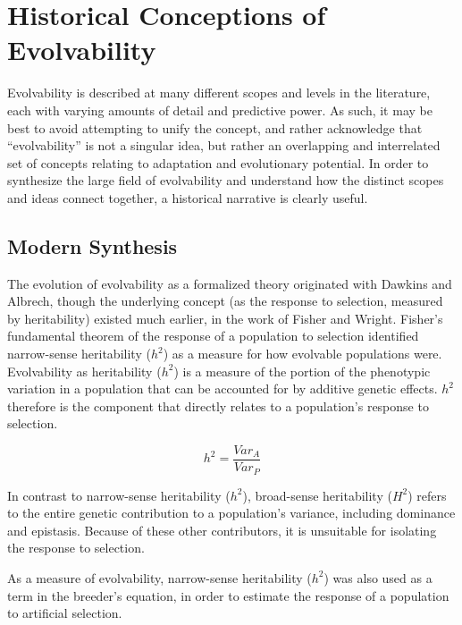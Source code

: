 \documentclass[PhD]{msu-thesis}
\begin{document}
\section{Historical Conceptions of Evolvability}
Evolvability is described at many different scopes and levels in the literature, each with varying amounts of detail and predictive power. As such, it may be best to avoid attempting to unify the concept, and rather acknowledge that “evolvability” is not a singular idea, but rather an overlapping and interrelated set of concepts relating to adaptation and evolutionary potential. In order to synthesize the large field of evolvability and understand how the distinct scopes and ideas connect together, a historical narrative is clearly useful.

\subsection{Modern Synthesis}
The evolution of evolvability as a formalized theory originated with Dawkins\cite{dawkins_13_2003} and \\Albrech\cite{alberch_genes_1991}, though the underlying concept (as the response to selection, measured by heritability) existed much earlier, in the work of Fisher\cite{fisher_genetical_1930} and Wright\cite{wright_evolution_1931}. Fisher’s fundamental theorem of the response of a population to selection identified narrow-sense heritability ($h^2$) as a measure for how evolvable populations were. Evolvability as heritability ($h^2$) is a measure of the portion of the phenotypic variation in a population that can be accounted for by additive genetic effects. $h^2$ therefore is the component that directly relates to a population’s response to selection\cite{houle_comparing_1992}.

\begin{equation}
h^2 = \frac{Var_A}{Var_P}
\end{equation}

In contrast to narrow-sense heritability ($h^2$), broad-sense heritability ($H^2$) refers to the entire genetic contribution to a population’s variance, including dominance and epistasis. Because of these other contributors, it is unsuitable for isolating the response to selection. 

As a measure of evolvability, narrow-sense heritability ($h^2$) was also used as a term in the breeder’s equation, in order to estimate the response of a population to artificial selection.
\end{document}
